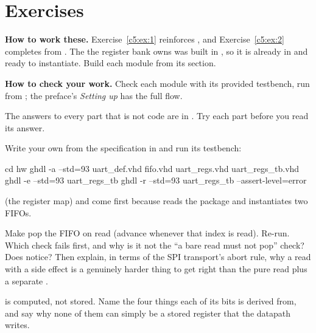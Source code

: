 
\section{Exercises}
\label{c5:sec:exercises}\label{c5:app:b}

\begin{aside}
\textbf{How to work these.} Exercise~\ref{c5:ex:1} reinforces , and
Exercise~\ref{c5:ex:2} completes  from . The  the
register bank owns was built in , so it is already in  and ready to
instantiate. Build each module from its section.

\textbf{How to check your work.} Check each module with its provided testbench, run from
; the preface's \emph{Setting up} has the full flow.

The answers to every part that is not code are in . Try each part before you read its
answer.
\end{aside}

\label{c5:ex:1}

 Write your own  from the specification in 
and run its testbench:

\begin{shell}
cd hw
ghdl -a --std=93 uart_def.vhd fifo.vhd uart_regs.vhd uart_regs_tb.vhd
ghdl -e --std=93 uart_regs_tb
ghdl -r --std=93 uart_regs_tb --assert-level=error
\end{shell}

\noindent {} (the register map) and  come first because
 reads the package and instantiates two FIFOs.

 Make  pop the FIFO on read (advance  whenever that index is
read). Re-run. Which check fails first, and why is it not the ``a bare  read must not
pop'' check? Does  notice? Then explain, in terms of the SPI transport's abort
rule, why a read with a side effect is a genuinely harder thing to get right than the pure read plus
a separate .

  is computed, not stored. Name the four things each of its bits is derived
from, and say why none of them can simply be a stored register that the datapath writes.

